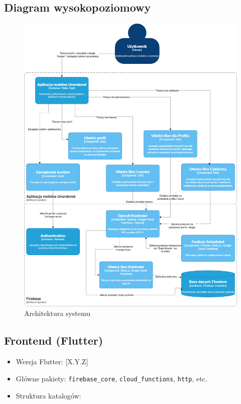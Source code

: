 \documentclass[a4paper, 12pt]{article}
\begin{document}
\subsection{Diagram wysokopoziomowy}
\begin{figure}[ht]
    \centering
    \includegraphics[height=0.745\textheight,keepaspectratio]{images/unordered.c4.png}
    \caption{Architektura systemu}
    \label{fig:architecture}
\end{figure}

\newpage

\subsection{Frontend (Flutter)}
\begin{itemize}
    \item Wersja Flutter: [X.Y.Z]
    \item Główne pakiety: \texttt{firebase\_core}, \texttt{cloud\_functions}, \texttt{http}, etc.
    \item Struktura katalogów:
    \begin{lstlisting}[language=bash]
    \end{lstlisting}
\end{itemize}
\end{document}
